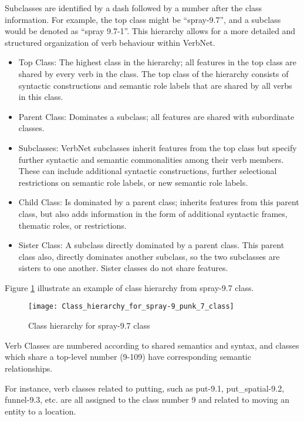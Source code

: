 Subclasses are identified by a dash followed by a number after the class information. For example, the top class might be \enquote{spray-9.7}, and a subclass would be denoted as \enquote{spray 9.7-1}. This hierarchy allows for a more detailed and structured organization of verb behaviour within VerbNet. 
\begin{itemize}

\item Top Class: The highest class in the hierarchy; all features in the top class are shared by every verb in the class. The top class of the hierarchy consists of syntactic constructions and semantic role labels that are shared by all verbs in this class.

\item Parent Class: Dominates a subclass; all features are shared with subordinate classes.

\item Subclasses: VerbNet subclasses inherit features from the top class but specify further syntactic and semantic commonalities among their verb members. These can include additional syntactic constructions, further selectional restrictions on semantic role labels, or new semantic role labels.

\item Child Class: Is dominated by a parent class; inherits features from this parent class, but also adds information in the form of additional syntactic frames, thematic roles, or restrictions. 

\item Sister Class: A subclass directly dominated by a parent class. This parent class also, directly dominates another subclass, so the two subclasses are sisters to one another. Sister classes do not share features.

\end{itemize}
Figure \ref{fig:hierachy_class} illustrate an example of class hierarchy from spray-9.7 class.
\begin{figure}[h]
\center
\texttt{[image: Class\_hierarchy\_for\_spray-9\_punk\_7\_class]}
\caption{Class hierarchy for spray-9.7 class \cite{heck2014quality}}\label{fig:hierachy_class}
\end{figure}
Verb Classes are numbered according to shared semantics and syntax, and classes which share a top-level number (9-109) have corresponding semantic relationships. 

For instance, verb classes related to putting, such as put-9.1, put\_spatial-9.2, funnel-9.3, etc. are all assigned to the class number 9 and related to moving an entity to a location. 

